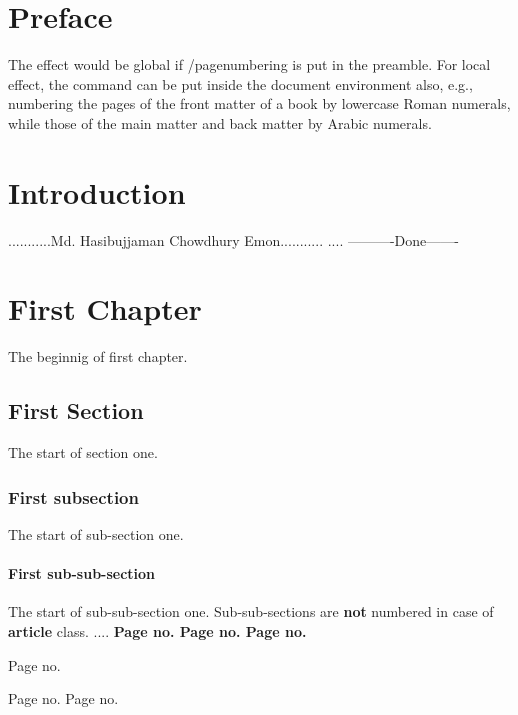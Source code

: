\documentclass[openany]{book}
\begin{document}
\chapter*{Preface}
\Large
The effect would be global if /pagenumbering{} is put in the preamble. For local effect, the command can be put inside the document environment also, e.g., numbering the pages of the front matter of a book by lowercase Roman numerals, while those of the main matter and back matter by Arabic numerals.\\
\chapter*{Introduction}
...........Md. Hasibujjaman Chowdhury Emon...........
\newpage
\thispagestyle{empty} %
....
\newpage
\vspace*{\fill}
----------Done-------




\chapter{First Chapter}
	The beginnig of first chapter.
		\section{First Section}
		The start of section one.
			\subsection{First subsection}
			The start of sub-section one.
				\subsubsection{First sub-sub-section}
					The start of sub-sub-section one. Sub-sub-sections are {\bf\Huge not} numbered in case of {\bf\huge article} class.
					\newpage
					....
                    \newpage
                    \Huge\bfseries
                    Page no. \thepage
                    \newpage
                    Page no. \thepage
                    \newpage
                    Page no. \thepage
                    \newpage

                    \setcounter{page}{5} %
                    \vspace*{\fill} Page no. \thepage \vspace*{\fill}

                    \newpage
                    Page no. \thepage
                    \newpage
                    Page no. \thepage
                    \newpage
\end{document}

